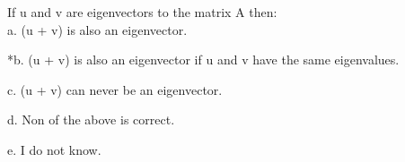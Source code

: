 
If u and v are eigenvectors to the matrix A then: \\

a. (u + v) is also an eigenvector. 

*b. (u + v) is also an eigenvector if u and v have the same eigenvalues.

c. (u + v) can never be an eigenvector.

d. Non of the above is correct.

e. I do not know. \\
